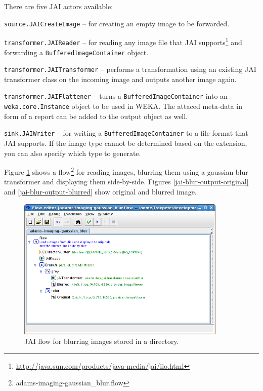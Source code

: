 \documentclass[a4paper]{book}
\begin{document}
There are five JAI actors available:
\begin{tight_itemize}
    \item \texttt{source.JAICreateImage} -- for creating an empty image to be 
    forwarded.
	\item \texttt{transformer.JAIReader} -- for reading any image file that	JAI
	supports\footnote{\url{http://java.sun.com/products/java-media/jai/iio.html}{}} and forwarding a \texttt{BufferedImageContainer} object.
	\item \texttt{transformer.JAITransformer} -- performs a transformation
	using an existing JAI transformer class on the incoming image and
	outputs another image again.
	\item \texttt{transformer.JAIFlattener} -- turns a
	\texttt{BufferedImageContainer} into an \texttt{weka.core.Instance} object to
	be used in WEKA. The attaced meta-data in form of a report can be added to the
	output object as well.
	\item \texttt{sink.JAIWriter} -- for writing a \texttt{BufferedImageContainer}
	to a file format that JAI supports. If the image type cannot be
	determined based on the extension, you can also specify which type to generate.
\end{tight_itemize}

Figure \ref{jai-blur-flow} shows a
flow\footnote{adams-imaging-gaussian\_blur.flow} for reading images, blurring
them using a gaussian blur transformer and displaying them side-by-side. Figures
\ref{jai-blur-output-original} and \ref{jai-blur-output-blurred} show original
and blurred image.

\begin{figure}[htb]
  \centering
  \includegraphics[width=10.0cm]{images/jai-blur-flow.png}
  \caption{JAI flow for blurring images stored in a directory.}
  \label{jai-blur-flow}
\end{figure}
\end{document}
